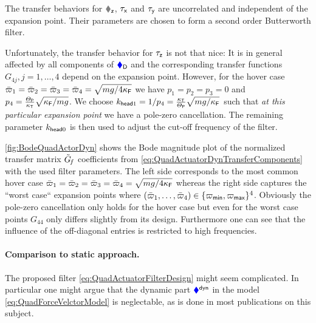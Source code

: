 The transfer behaviors for $\Fz$, $\taux$ and $\tauy$ are uncorrelated and independent of the expansion point.
Their parameters are chosen to form a second order Butterworth filter.

Unfortunately, the transfer behavior for $\tauz$ is not that nice:
It is in general affected by all components of $\genForceD$ and the corresponding transfer functions $G_{4j}, j=1,\ldots,4$ depend on the expansion point.
However, for the hover case $\PropVelStat[1] = \PropVelStat[2] = \PropVelStat[3] = \PropVelStat[4] = \sqrt{\sfrac{m \gravityAccConst}{4\kappaF}}$ we have $p_1=p_2=p_3=0$ and $p_4 = \tfrac{\PropInertia}{\kappaT}\sqrt{\sfrac{\kappaF}{m \gravityAccConst}}$.
We choose $\kDHead = \sfrac{1}{p_4} = \tfrac{\kappaT}{\PropInertia}\sqrt{\sfrac{m \gravityAccConst}{\kappaF}}$ such that \textit{at this particular expansion point} we have a pole-zero cancellation.
The remaining parameter $\kPHead$ is then used to adjust the cut-off frequency of the filter.

\autoref{fig:BodeQuadActorDyn} shows the Bode magnitude plot of the normalized transfer matrix $\GenForceTransferFunctionNorm$ coefficients from \eqref{eq:QuadActuatorDynTransferComponents} with the used filter parameters.
The left side corresponds to the most common hover case $\PropVelStat[1] = \PropVelStat[2] = \PropVelStat[3] = \PropVelStat[4] = \sqrt{\sfrac{m \gravityAccConst}{4\kappaF}}$ whereas the right side captures the ``worst case`` expansion points where $(\PropVelStat[1], \ldots,\PropVelStat[4]) \in \{ \PropVelMin, \PropVelMax\}^4$.
Obviously the pole-zero cancellation only holds for the hover case but even for the worst case points $G_{44}$ only differs slightly from its design.
Furthermore one can see that the influence of the off-diagonal entries is restricted to high frequencies.


\paragraph{Comparison to static approach.}
The proposed filter \eqref{eq:QuadActuatorFilterDesign} might seem complicated.
In particular one might argue that the dynamic part $\genForceQuadDyn$ in the model \eqref{eq:QuadForceVelctorModel} is neglectable, as is done in most publications on this subject.

